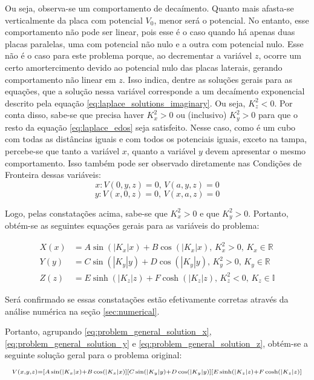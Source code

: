 \documentclass{report}
\begin{document}
Ou seja, observa-se um comportamento de decaímento. Quanto mais afasta-se verticalmente da placa com potencial $ V_0 $,
menor será o potencial. No entanto, esse comportamento não pode ser linear, pois esse é o caso quando há apenas duas placas
paralelas, uma com potencial não nulo e a outra com potencial nulo. Esse não é o caso para este problema porque, ao decrementar
a variável $ z $, ocorre um certo amortercimento devido ao potencial nulo das placas laterais, gerando comportamento não linear
em $ z $. Isso indica, dentre as soluções gerais para as equações, que a solução nessa variável corresponde
a um decaímento exponencial descrito pela equação \ref{eq:laplace_solutions_imaginary}. Ou seja, $ K_z^2 < 0 $. Por conta
disso, sabe-se que precisa haver $ K_x^2 > 0 $ ou (inclusivo) $ K_y^2 > 0 $ para que o resto da equação \ref{eq:laplace_edos} seja satisfeito.
Nesse caso, como é um cubo com todas as distâncias iguais e com todos os potenciais iguais, exceto na tampa, percebe-se que tanto
a variável $ x $, quanto a variável $ y $ devem apresentar o mesmo comportamento. Isso também pode ser observado diretamente nas
Condições de Fronteira dessas variáveis:
$$ x: V(0, y, z) = 0,\, V(a, y, z) = 0 $$
$$ y: V(x, 0, z) = 0,\, V(x, a, z) = 0 $$

Logo, pelas constatações acima, sabe-se que $ K_x^2 > 0 $ e que $ K_y^2 > 0 $. Portanto, obtém-se as seguintes equações gerais para as
variáveis do problema:

\vspace*{-1.5\baselineskip}
\begin{center}
  \begin{align}
    \label{eq:problem_general_solution_x}
    X(x) &= A\sin(|K_x|x) + B\cos(|K_x|x),\, K_x^2 > 0,\, K_x \in \mathbb{R} \\
    \label{eq:problem_general_solution_y}
    Y(y) &= C\sin(|K_y|y) + D\cos(|K_y|y),\, K_y^2 > 0,\, K_y \in \mathbb{R} \\
    \label{eq:problem_general_solution_z}
    Z(z) &= E\sinh(|K_z|z) + F\cosh(|K_z|z),\, K_z^2 < 0,\, K_z \in \mathbb{I}
  \end{align}
\end{center}

Será confirmado se essas constatações estão efetivamente corretas através da
análise numérica na seção \ref{sec:numerical}.

Portanto, agrupando \ref{eq:problem_general_solution_x}, \ref{eq:problem_general_solution_y} e
\ref{eq:problem_general_solution_z}, obtém-se a seguinte solução geral para o problema original:
\begin{equation}
    \label{eq:problem_general_solution}
    \centering
    {\scriptstyle V(x, y, z) = [A\sin(|K_x|x) + B\cos(|K_x|x)][C\sin(|K_y|y) + D\cos(|K_y|y)][E\sinh(|K_z|z) + F\cosh(|K_z|z)]}
\end{equation}
\end{document}
